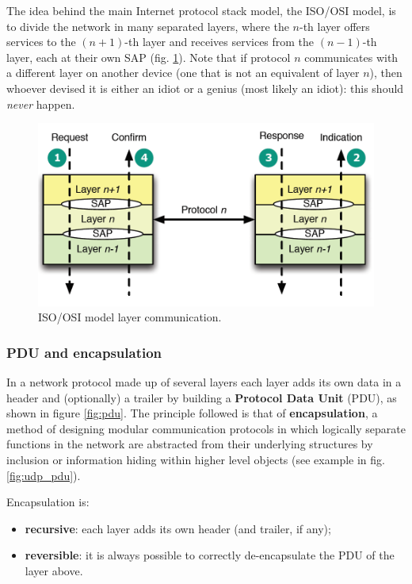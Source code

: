 The idea behind the main Internet protocol stack model, the ISO/OSI model, is to divide the network in many separated layers, where the $n$-th layer offers services to the $(n+1)$-th layer and receives services from the $(n-1)$-th layer, each at their own SAP (fig. \ref{fig:layers_idea}). Note that if protocol $n$ communicates with a different layer on another device (one that is not an equivalent of layer $n$), then whoever devised it is either an idiot or a genius (most likely an idiot): this should \textit{never} happen.

\begin{figure}[H]
    \centering
    \includegraphics[scale=0.5]{img/layers_idea.png}
    \decoRule
    \caption{ISO/OSI model layer communication.}
    \label{fig:layers_idea}
\end{figure}


\subsubsection*{PDU and encapsulation}
In a network protocol made up of several layers each layer adds its own data in a header and (optionally) a trailer by building a \textbf{Protocol Data Unit} (PDU), as shown in figure \ref{fig:pdu}. The principle followed is that of \textbf{encapsulation}, a method of designing modular communication protocols in which logically separate functions in the network are abstracted from their underlying structures by inclusion or information hiding within higher level objects (see example in fig. \ref{fig:udp_pdu}).

Encapsulation is:

\begin{itemize}
    \item \textbf{recursive}: each layer adds its own header (and trailer, if any);
    \item \textbf{reversible}: it is always possible to correctly de-encapsulate the PDU of the layer above.
\end{itemize}

